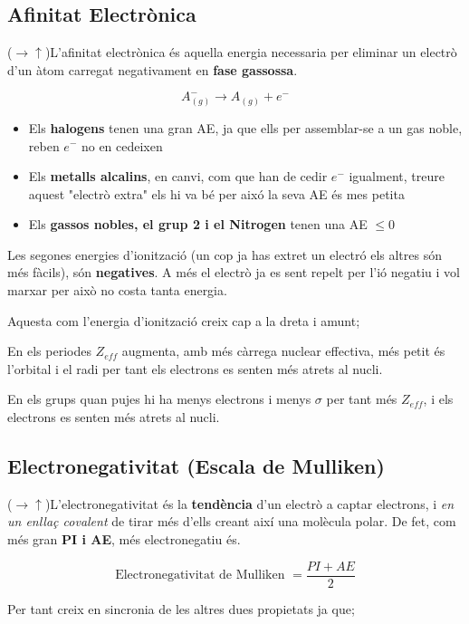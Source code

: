 \documentclass[12pt]{article}
\begin{document}
\subsection{Afinitat Electrònica}

($\rightarrow\uparrow$)L'afinitat electrònica és aquella energia necessaria per eliminar un electrò d'un àtom carregat negativament en \textbf{fase gassossa}.

\[A^-_{(g)} \rightarrow A_{(g)} + e^-\]


\begin{itemize}
    \item Els \textbf{halogens} tenen una gran AE, ja que ells per assemblar-se a un gas noble, reben $e^-$ no en cedeixen
    \item Els \textbf{metalls alcalins}, en canvi, com que han de cedir $e^-$ igualment, treure aquest "electrò extra" els hi va bé per aixó la seva AE és mes petita
    \item Els \textbf{gassos nobles, el grup 2 i el Nitrogen} tenen una AE $\leq 0$
\end{itemize}

Les segones energies d'ionització (un cop ja has extret un electró els altres són més fàcils), són \textbf{negatives}. A més el electrò ja es sent repelt per l'ió negatiu i vol marxar per això no costa tanta energia.

Aquesta com l'energia d'ionització creix cap a la dreta i amunt;

En els periodes $Z_{eff}$ augmenta, amb més càrrega nuclear effectiva, més petit és l'orbital i el radi per tant els electrons es senten més atrets al nucli.

En els grups quan pujes hi ha menys electrons i menys $\sigma$ per tant més $Z_{eff}$, i els electrons es senten més atrets al nucli.

\subsection{Electronegativitat (Escala de Mulliken)}

($\rightarrow\uparrow$)L'electronegativitat és la \textbf{tendència} d'un electrò a captar electrons, i \textit{en un enllaç covalent} de tirar més d'ells creant així una molècula polar. De fet, com més gran \textbf{PI i AE}, més electronegatiu és.

\[\text{Electronegativitat de Mulliken } = \boxed{\frac{PI + AE}{2}}\]

Per tant creix en sincronia de les altres dues propietats ja que;
\end{document}
